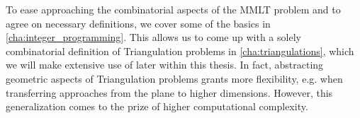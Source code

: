 To ease approaching the combinatorial aspects of the \gls{MMLT} problem
and to agree on necessary definitions, we cover some of the basics in
\cref{cha:integer_programming}. This allows us to come up with a
solely combinatorial definition of Triangulation problems in
\cref{cha:triangulations}, which we will make extensive use of later
within this thesis. In fact, abstracting geometric aspects of
Triangulation problems grants more flexibility, e.g. when transferring
approaches from the plane to higher dimensions. However, this
generalization comes to the prize of higher computational complexity.


